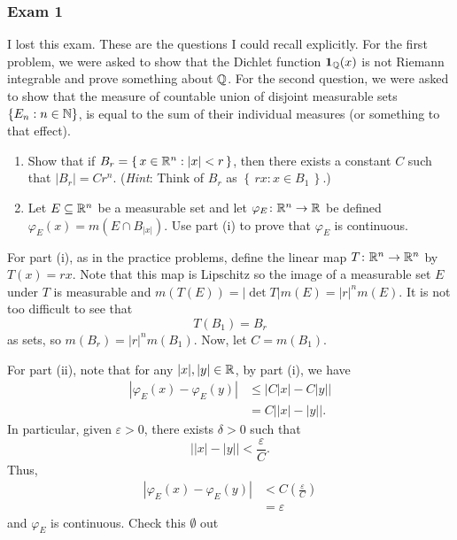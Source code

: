 \subsubsection{Exam 1}
\setcounter{exercise}{0}
\setcounter{equation}{0}

I lost this exam. These are the questions I could recall explicitly. For
the first problem, we were asked to show that the Dichlet function
\(\operatorname{\mathbf{1}}_{\mathbb{Q}}(x)\) is not Riemann integrable and prove something about
\(\mathbb{Q}\). For the second question, we were asked to show that the measure
of countable union of disjoint measurable sets \(\{E_n:n\in\mathbb{N}\}\), is
equal to the sum of their individual measures (or something to that
effect).
\begin{problem}
\end{problem}

\begin{problem}
\end{problem}

\begin{problem}
\hfill
\begin{enumerate}[label=(\roman*)]
\item Show that if \(B_r=\left\{\,x\in\mathbb{R}^n:|x|<r\,\right\}\), then there
  exists a constant \(C\) such that \(|B_r|=Cr^n\). (\emph{Hint}: Think of
  \(B_r\) as \(\left\{\,rx:x\in B_1\,\right\}\).)
\item Let \(E\subseteq\mathbb{R}^n\) be a measurable set and let
  \(\varphi_E\colon\mathbb{R}^n\to\mathbb{R}\) be defined
  \(\varphi_E(x)=m(E\cap B_{|x|})\). Use part (i) to prove that
  \(\varphi_E\) is continuous.
\end{enumerate}
\end{problem}
\begin{solution}
  For part (i), as in the practice problems, define the linear map
  \(T\colon\mathbb{R}^n\to\mathbb{R}^n\) by \(T(x)=rx\). Note that this map is
  Lipschitz so the image of a measurable set \(E\) under \(T\) is
  measurable and \(m(T(E))=|{\det T}|m(E)=|r|^nm(E)\). It is not too
  difficult to see that
  \[
    T(B_1)=B_r
  \]
  as sets, so \(m(B_r)=|r|^nm(B_1)\). Now, let \(C=m(B_1)\).

  For part (ii), note that for any \(|x|,|y|\in\mathbb{R}\), by part (i), we have
  \begin{align*}
    |\varphi_E(x)-\varphi_E(y)|
    &\leq\bigr|C|x|-C|y|\bigl|\\
    &=C\bigl||x|-|y|\bigr|.
  \end{align*}
  In particular, given \(\varepsilon>0\), there exists \(\delta>0\) such
  that
  \[
    \bigl||x|-|y|\bigr|<\frac{\varepsilon}{C}.
  \]
  Thus,
  \begin{align*}
    |\varphi_E(x)-\varphi_E(y)|
    &<C\left(\frac{\varepsilon}{C}\right)\\
    &=\varepsilon
  \end{align*}
  and \(\varphi_E\) is continuous. Check this \(\emptyset\) out
\end{solution}

